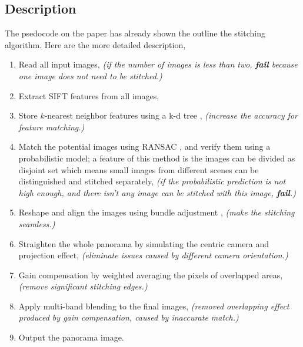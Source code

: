 \documentclass[10pt,twocolumn,letterpaper]{article}
\begin{document}
\subsection{Description}
The psedocode on the paper has already shown the outline the stitching algorithm.
Here are the more detailed description,
\begin{enumerate}
    \item
        Read all input images,
        \textit{(if the number of images is less than two, \textbf{fail} because one image does not need to be stitched.)}
    \item \label{n:e}
        Extract SIFT \cite{sift} features from all images,
    \item \label{n:k}
        Store $k$-nearest neighbor features using a k-d tree \cite{knn},
        \textit{(increase the accuracy for feature matching.)}
    \item \label{n:m}
        Match the potential images using RANSAC \cite{ransac}, and verify them using a probabilistic model;
        a feature of this method is the images can be divided as disjoint set which means small images from different scenes can be distinguished and stitched separately,
        \textit{(if the probabilistic prediction is not high enough, and there isn't any image can be stitched with this image, \textbf{fail}.)}
    \item \label{n:r}
        Reshape and align the images using bundle adjustment \cite{bm},
        \textit{(make the stitching seamless.)}
    \item \label{n:s}
        Straighten the whole panorama by simulating the centric camera and projection effect,
        \textit{(eliminate issues caused by different camera orientation.)}
    \item \label{n:g}
        Gain compensation by weighted averaging the pixels of overlapped areas,
        \textit{(remove significant stitching edges.)}
    \item \label{n:a}
        Apply multi-band blending to the final images,
        \textit{(removed overlapping effect produced by gain compensation, caused by inaccurate match.)}
    \item \label{n:o}
        Output the panorama image.
\end{enumerate}

\end{document}
